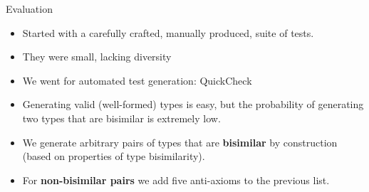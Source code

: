 \documentclass[10pt]{beamer}
\begin{document}
\begin{frame}{Evaluation}
  \begin{itemize}
  \item Started with a carefully crafted, manually produced, suite of tests.
  \smallskip
  \item They were small, lacking diversity
  \smallskip
  \item We went for automated test generation: QuickCheck
  \smallskip
  \item Generating valid (well-formed) types is easy, but the probability of
    generating two types that are bisimilar is extremely low.
    \smallskip
  \item We generate arbitrary pairs of types that are \textbf{bisimilar}
    by construction (based on properties of type bisimilarity).
    \smallskip
  \item For \textbf{non-bisimilar pairs} we add five anti-axioms to the previous list.
  \end{itemize}
     
\end{frame}

  

\end{document}
